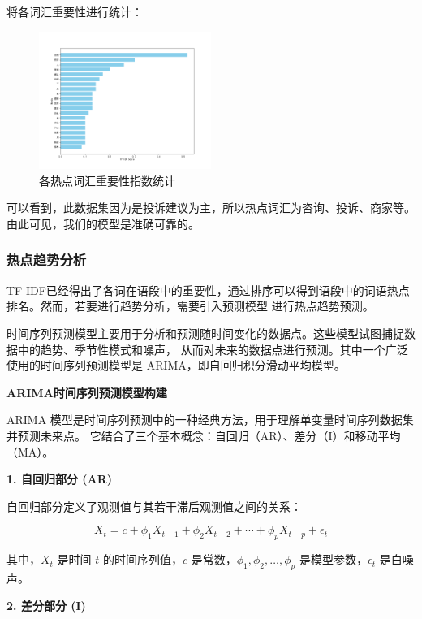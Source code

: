 \documentclass[UTF8,a4paper,15pt,titlepage,oneside]{ctexbook}
\begin{document}
将各词汇重要性进行统计：

\begin{figure}[H]
  \centering
  \includegraphics[width=0.5\textwidth,keepaspectratio=false]{pictures/12.png} %
  \caption{各热点词汇重要性指数统计}
\end{figure}

可以看到，此数据集因为是投诉建议为主，所以热点词汇为咨询、投诉、商家等。由此可见，我们的模型是准确可靠的。

\subsubsection{热点趋势分析}

TF-IDF已经得出了各词在语段中的重要性，通过排序可以得到语段中的词语热点排名。然而，若要进行趋势分析，需要引入预测模型
进行热点趋势预测。

时间序列预测模型主要用于分析和预测随时间变化的数据点。这些模型试图捕捉数据中的趋势、季节性模式和噪声，
从而对未来的数据点进行预测。其中一个广泛使用的时间序列预测模型是 ARIMA，即自回归积分滑动平均模型。

\vskip 0.2cm
\noindent
\textbf{ARIMA时间序列预测模型构建}

ARIMA 模型是时间序列预测中的一种经典方法，用于理解单变量时间序列数据集并预测未来点。
它结合了三个基本概念：自回归（AR）、差分（I）和移动平均（MA）。

\vskip 0.2cm
\noindent
\textbf{1. 自回归部分 (AR)}

自回归部分定义了观测值与其若干滞后观测值之间的关系：

\begin{equation}
X_t = c + \phi_1 X_{t-1} + \phi_2 X_{t-2} + \cdots + \phi_p X_{t-p} + \epsilon_t
\end{equation}

其中，$X_t$ 是时间 $t$ 的时间序列值，$c$ 是常数，$\phi_1, \phi_2, \ldots, \phi_p$ 是模型参数，$\epsilon_t$ 是白噪声。

\vskip 0.2cm
\noindent
\textbf{2. 差分部分 (I)}
\end{document}
